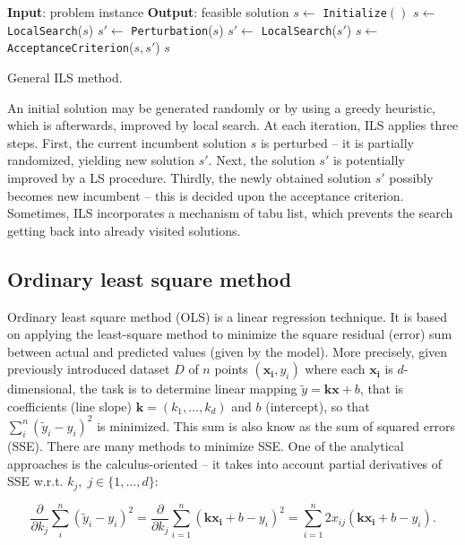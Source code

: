 \documentclass[a4paper,12pt]{elsarticle}
\begin{document}
	\begin{algorithm}
		\begin{algorithmic}[1] 
			\State \textbf{Input}: problem instance
			\State \textbf{Output}: feasible solution 
			\State $s \gets$ \texttt{Initialize}$()$
			\State  $s \gets$ \texttt{LocalSearch}($s$)
			\State  $s' \gets$ \texttt{Perturbation}($s$)
			\State  $s' \gets$ \texttt{LocalSearch}($s'$)
			\State  $ s \gets$ \texttt{AcceptanceCriterion}($s, s'$)
			\EndWhile
			\State \Return $s$
		\end{algorithmic}
		\caption{General ILS method.}
		\label{alg:ils}
	\end{algorithm}  
	
	An initial solution may be generated randomly or by using a greedy heuristic, which is afterwards, improved by local search. At each iteration, ILS applies three steps. First, the current incumbent solution $s$ is perturbed -- it is partially randomized, yielding new solution $s'$. Next, the solution $s'$ is potentially improved by a LS procedure. Thirdly, the newly obtained solution $s'$  possibly becomes new incumbent -- this is decided upon the acceptance criterion. Sometimes, ILS incorporates a mechanism of tabu list, which prevents the search getting back into already visited solutions.  		 
	
	\subsection{Ordinary least square method}\label{sec:ols}
	Ordinary least square method (OLS) is a linear regression technique. It is based on applying the least-square method to minimize the square residual (error) sum  between actual and predicted values (given by the model). More precisely, given previously introduced dataset $D$ of $n$ points $(\mathbf{x_i}, y_i)$ where each $\mathbf{x_i}$ is $d$-dimensional, the task is to determine linear mapping $\tilde{y} = \mathbf{k} \mathbf{x} + b$, that is coefficients (line slope) $\mathbf{k} = (k_1, \ldots, k_d)$ and $b$ (intercept), so that $ \sum_{i}^{n} (\tilde{y}_i - y_i)^2 $ is minimized. This sum is also know as the sum of squared errors (SSE). There are many methods to minimize SSE. One of the analytical approaches is the calculus-oriented -- it takes into account partial derivatives of SSE w.r.t. $k_j,\; j \in \{1, ..., d\}$: 
	
	$$  \frac{\partial}{\partial k_j} \sum_{i}^{n} (\tilde{y}_i - y_i)^2 = \frac{\partial}{\partial k_j} \sum_{i=1}^{n} ( \mathbf{k}\mathbf{x_i}+b  - y_i)^2 =  \sum_{i=1}^{n} 2x_{ij}(\mathbf{k}\mathbf{x_i} + b - y_i).$$
  
\end{document}
